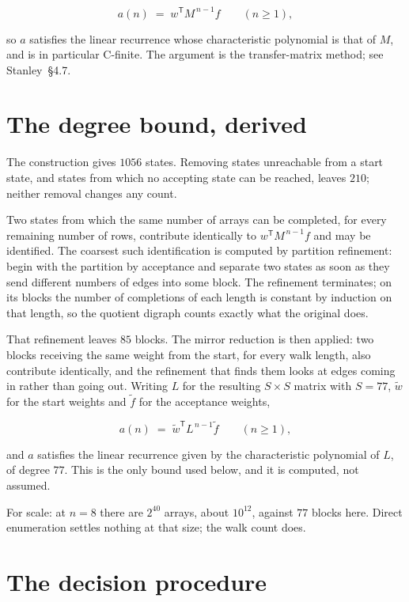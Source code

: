 \documentclass[11pt]{article}
\theoremstyle{definition}
\begin{document}
\[a(n) \;=\; w^{\mathsf T} M^{\,n-1} f \qquad (n \ge 1),\]

so $a$ satisfies the linear recurrence whose characteristic polynomial is that of $M$, and is in particular C-finite. The argument is the transfer-matrix method; see Stanley~\S4.7.

\section{The degree bound, derived}

The construction gives $1056$ states. Removing states unreachable from a start state, and states from which no accepting state can be reached, leaves $210$; neither removal changes any count.

Two states from which the same number of arrays can be completed, for every remaining number of rows, contribute identically to $w^{\mathsf T}M^{\,n-1}f$ and may be identified. The coarsest such identification is computed by partition refinement: begin with the partition by acceptance and separate two states as soon as they send different numbers of edges into some block. The refinement terminates; on its blocks the number of completions of each length is constant by induction on that length, so the quotient digraph counts exactly what the original does.

That refinement leaves $85$ blocks. The mirror reduction is then applied: two blocks receiving the same weight from the start, for every walk length, also contribute identically, and the refinement that finds them looks at edges coming in rather than going out. Writing $L$ for the resulting $S \times S$ matrix with $S = 77$, $\tilde w$ for the start weights and $\tilde f$ for the acceptance weights,

\[a(n) \;=\; \tilde w^{\mathsf T} L^{\,n-1} \tilde f \qquad (n \ge 1),\]

and $a$ satisfies the linear recurrence given by the characteristic polynomial of $L$, of degree $77$. This is the only bound used below, and it is computed, not assumed.

For scale: at $n = 8$ there are $2^{40}$ arrays, about $10^{12}$, against $77$ blocks here. Direct enumeration settles nothing at that size; the walk count does.

\section{The decision procedure}
\end{document}

